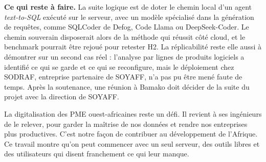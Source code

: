 \textbf{Ce qui reste à faire.} La suite logique est de doter le chemin local d'un agent \textit{text-to-SQL} exécuté sur le serveur, avec un modèle spécialisé dans la génération de requêtes, comme SQLCoder de Defog, Code Llama ou DeepSeek-Coder. Le chemin souverain disposerait alors de la méthode qui réussit côté cloud, et le benchmark pourrait être rejoué pour retester H2. La réplicabilité reste elle aussi à démontrer sur un second cas réel : l'analyse par lignes de produits logiciels a identifié ce qui se garde et ce qui se reconfigure, mais le déploiement chez SODRAF, entreprise partenaire de SOYAFF, n'a pas pu être mené faute de temps. Après la soutenance, une réunion à Bamako doit décider de la suite du projet avec la direction de SOYAFF.

La digitalisation des PME ouest-africaines reste un défi. Il revient à ses ingénieurs de le relever, pour garder la maîtrise de nos données et rendre nos entreprises plus productives. C'est notre façon de contribuer au développement de l'Afrique. Ce travail montre qu'on peut commencer avec un seul serveur, des outils libres et des utilisateurs qui disent franchement ce qui leur manque.
